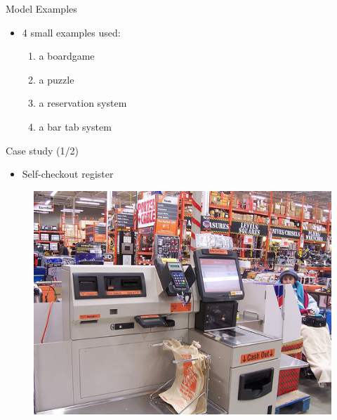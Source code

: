 \documentclass{FMTslides}
\begin{document}
\begin{frame}{Model Examples}
\begin{itemize}[<+->]
  \item 4 small examples used:
  \begin{enumerate}
    \item a boardgame
    \item a puzzle
    \item a reservation system
    \item a bar tab system
  \end{enumerate}
\end{itemize}
\end{frame}

\begin{frame}{Case study (1/2)}
  \begin{itemize}[<+->]
  \item Self-checkout register
\end{itemize}
\begin{figure}
\centering\includegraphics[scale=0.4]{./figures/self-check-out.jpg}
\end{figure}
\end{frame}
\end{document}
